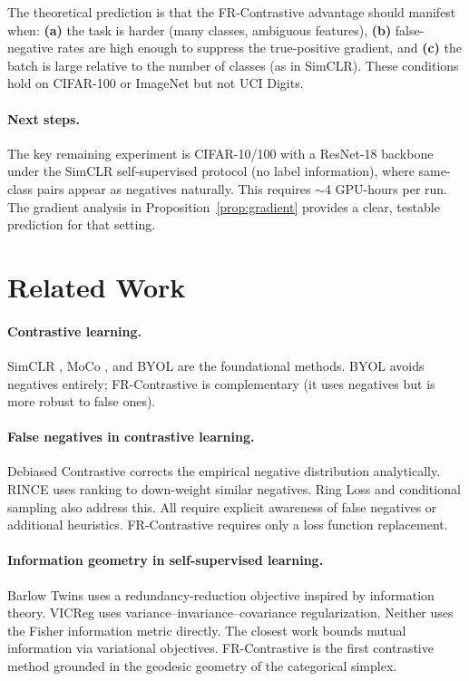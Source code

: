 \documentclass[11pt]{article}
\begin{document}
The theoretical prediction is that the FR-Contrastive advantage should manifest when:
\textbf{(a)} the task is harder (many classes, ambiguous features), \textbf{(b)}
false-negative rates are high enough to suppress the true-positive gradient, and
\textbf{(c)} the batch is large relative to the number of classes (as in SimCLR).
These conditions hold on CIFAR-100 or ImageNet but not UCI Digits.

\paragraph{Next steps.}
The key remaining experiment is CIFAR-10/100 with a ResNet-18 backbone under the
SimCLR self-supervised protocol (no label information), where same-class pairs appear
as negatives naturally. This requires $\sim$4 GPU-hours per run. The gradient analysis
in Proposition~\ref{prop:gradient} provides a clear, testable prediction for that setting.

\section{Related Work}

\paragraph{Contrastive learning.}
SimCLR \citep{chen2020simple}, MoCo \citep{he2020momentum}, and BYOL
\citep{grill2020bootstrap} are the foundational methods. BYOL avoids negatives entirely;
FR-Contrastive is complementary (it uses negatives but is more robust to false ones).

\paragraph{False negatives in contrastive learning.}
Debiased Contrastive \citep{chuang2020debiased} corrects the empirical negative distribution
analytically. RINCE \citep{hoffmann2022ranking} uses ranking to down-weight similar
negatives. Ring Loss and conditional sampling also address this. All require explicit
awareness of false negatives or additional heuristics. FR-Contrastive requires only a loss
function replacement.

\paragraph{Information geometry in self-supervised learning.}
Barlow Twins \citep{zbontar2021barlow} uses a redundancy-reduction objective inspired by
information theory. VICReg \citep{bardes2022vicreg} uses variance--invariance--covariance
regularization. Neither uses the Fisher information metric directly. The closest work bounds mutual information via variational objectives. FR-Contrastive is the first
contrastive method grounded in the geodesic geometry of the categorical simplex.
\end{document}
